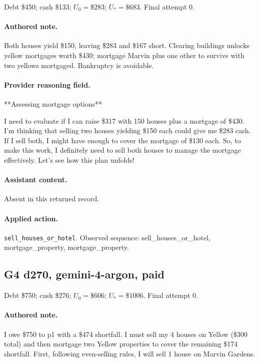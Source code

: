 \noindent Debt \$450; cash \$133; $U_0=\$283$; $U_*=\$683$. Final attempt 0.\par

\paragraph{Authored note.} Both houses yield \$150, leaving \$283 and \$167 short. Clearing buildings unlocks yellow mortgages worth \$430; mortgage Marvin plus one other to survive with two yellows mortgaged. Bankruptcy is avoidable.

\paragraph{Provider reasoning field.} **Assessing mortgage options**

I need to evaluate if I can raise \$317 with 150 houses plus a mortgage of \$430. I'm thinking that selling two houses yielding \$150 each could give me \$283 cash. If I sell both, I might have enough to cover the mortgage of \$130 each. So, to make this work, I definitely need to sell both houses to manage the mortgage effectively. Let's see how this plan unfolds!

\paragraph{Assistant content.} Absent in this returned record.

\paragraph{Applied action.} \texttt{sell\_houses\_or\_hotel}. Observed sequence: sell\_houses\_or\_hotel, mortgage\_property, mortgage\_property.

\subsection*{G4 d270, gemini-4-argon, paid}

\noindent Debt \$750; cash \$276; $U_0=\$606$; $U_*=\$1006$. Final attempt 0.\par

\paragraph{Authored note.} I owe \$750 to p1 with a \$474 shortfall. I must sell my 4 houses on Yellow (\$300 total) and then mortgage two Yellow properties to cover the remaining \$174 shortfall. First, following even-selling rules, I will sell 1 house on Marvin Gardens.

